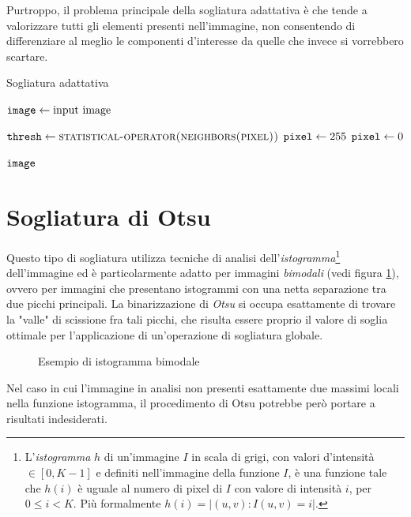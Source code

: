 Purtroppo, il problema principale della sogliatura adattativa \`e che tende a valorizzare tutti gli elementi presenti nell'immagine, non consentendo di differenziare al meglio le componenti d'interesse da quelle che invece si vorrebbero scartare.
\begin{algorithm}
	\caption{Sogliatura adattativa}
	\label{alg:thresh-local}
	\begin{algorithmic}[1]
			\State $\texttt{image} \gets \text{input image}$
			
				\State $\vars{thresh} \gets \textproc{statistical-operator(\textproc{neighbors(pixel)})}$
					\State $\texttt{pixel} \gets 255$
				\Else
					\State $\texttt{pixel} \gets 0$
				\EndIf
			\EndFor

			\Return $\texttt{image}$
		\EndFunction
	\end{algorithmic}
\end{algorithm}


\section{Sogliatura di Otsu}
\label{sec:image-bin-otsu}
Questo tipo di sogliatura utilizza tecniche di analisi dell'\textit{istogramma}\footnote{L'\textit{istogramma} $h$ di un'immagine $I$ in scala di grigi, con valori d'intensit\`a $\in [0, K - 1]$ e definiti nell'immagine della funzione $I$,  \`e una funzione tale che $h(i)$ \`e uguale al numero di pixel di $I$ con valore di intensit\`a $i$, per $0 \leq i < K$. Pi\`u formalmente $h(i)=|{(u, v)\colon I(u, v)=i}|$.} dell'immagine ed \`e particolarmente adatto per immagini \textit{bimodali} (vedi figura \ref{fig:bimodal-hist}), ovvero per immagini che presentano istogrammi con una netta separazione tra due picchi principali. La binarizzazione di \textit{Otsu} si occupa esattamente di trovare la "valle" di scissione fra tali picchi, che risulta essere proprio il valore di soglia ottimale per l'applicazione di un'operazione di sogliatura globale.\par
\pgfplotsset{compat=1.16,width=13cm,height=7cm}
\begin{figure}[t]
	\centering
	\caption{Esempio di istogramma bimodale} \label{fig:bimodal-hist}
\end{figure}
Nel caso in cui l'immagine in analisi non presenti esattamente due massimi locali nella funzione istogramma, il procedimento di Otsu potrebbe per\`o portare a risultati indesiderati.


